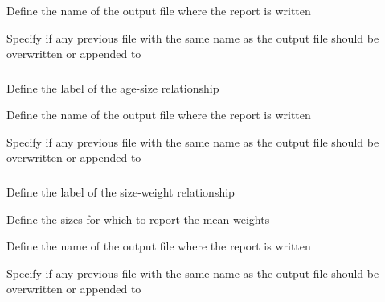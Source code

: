  {Define the name of the output file where the report is written}

 {Specify if any previous file with the same name as the output file should be overwritten or appended to}

\subsubsection[Print mean size at age]{}

 {Define the label of the age-size relationship}

 {Define the name of the output file where the report is written}

 {Specify if any previous file with the same name as the output file should be overwritten or appended to}

\subsubsection[Print mean weight at size]{}

 {Define the label of the size-weight relationship}

 {Define the sizes for which to report the mean weights}

 {Define the name of the output file where the report is written}

 {Specify if any previous file with the same name as the output file should be overwritten or appended to}

